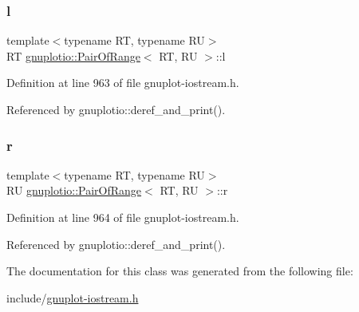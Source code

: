 \subsubsection{\texorpdfstring{l}{l}}
{\footnotesize\ttfamily template$<$typename RT, typename RU$>$ \\
RT \hyperlink{classgnuplotio_1_1_pair_of_range}{gnuplotio\+::\+Pair\+Of\+Range}$<$ RT, RU $>$\+::l\hspace{0.3cm}{\ttfamily [private]}}



Definition at line 963 of file gnuplot-\/iostream.\+h.



Referenced by gnuplotio\+::deref\+\_\+and\+\_\+print().

\mbox{\label{classgnuplotio_1_1_pair_of_range_a7c96877f553ed746e4b8d80e5ca0965e}} 
\subsubsection{\texorpdfstring{r}{r}}
{\footnotesize\ttfamily template$<$typename RT, typename RU$>$ \\
RU \hyperlink{classgnuplotio_1_1_pair_of_range}{gnuplotio\+::\+Pair\+Of\+Range}$<$ RT, RU $>$\+::r\hspace{0.3cm}{\ttfamily [private]}}



Definition at line 964 of file gnuplot-\/iostream.\+h.



Referenced by gnuplotio\+::deref\+\_\+and\+\_\+print().



The documentation for this class was generated from the following file\+:\begin{DoxyCompactItemize}
\item 
include/\hyperlink{gnuplot-iostream_8h}{gnuplot-\/iostream.\+h}\end{DoxyCompactItemize}
